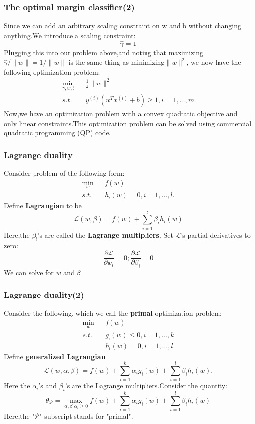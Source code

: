 \documentclass[slidestop,compress,mathserif]{beamer}
\begin{document}
    \begin{frame}[shrink]
        \frametitle{The optimal margin classifier(2)}
        Since we can add an arbitrary scaling constraint on w and b without changing anything.We introduce a scaling constraint:
        $$\hat{\gamma}=1$$
        Plugging this into our problem above,and noting that maximizing $\hat{\gamma}/\|w\|=1/\|w\|$ is the same thing as minimizing$\|w\|^2$, we now have the following optimization problem:
        \begin{eqnarray*}
            \min_{\gamma,w,b} && \frac{1}{2}\|w\|^2\\
            s.t. && y^{(i)}(w^Tx^{(i)}+b)\ge 1,i=1,\ldots,m
        \end{eqnarray*}
        Now,we have an optimization problem with a convex quadratic objective and only linear constraints.This optimization problem can be solved using commercial quadratic programming (QP) code.
        $$$$
    \end{frame}
    \begin{frame}[shrink]
        \frametitle{Lagrange duality}
        Consider problem of the following form:
        \begin{eqnarray*}
            \min_w && f(w)\\
            s.t. && h_i(w)=0,i=1,\ldots,l.
        \end{eqnarray*}
        Define \textbf{Lagrangian} to be
        $$\mathcal{L}(w,\beta)=f(w)+\sum_{i=1}^l\beta_ih_i(w)$$
        Here,the $\beta_i$'s are called the \textbf{Lagrange multipliers}. Set $\mathcal{L}$'s partial derivatives to zero:
        $$\frac{\partial\mathcal{L}}{\partial w_i}=0;\frac{\partial\mathcal{L}}{\partial \beta_i}=0$$
        We can solve for $w$ and $\beta$
        $$$$
    \end{frame}
    \begin{frame}[shrink]
        \frametitle{Lagrange duality(2)}
        Consider the following, which we call the \textbf{primal} optimization problem:
        \begin{eqnarray*}
            \min_w && f(w)\\
            s.t. && g_i(w) \le 0,i=1,\ldots,k\\
            && h_i(w)=0,i=1,\ldots,l
        \end{eqnarray*}
        Define \textbf{generalized Lagrangian}
        $$\mathcal{L}(w,\alpha,\beta)=f(w)+\sum_{i=1}^k\alpha_ig_i(w)+\sum_{i=1}^l\beta_ih_i(w).$$
        Here the $\alpha_i$'s and $\beta_i$'s are the Lagrange multipliers.Consider the quantity:
        $$\theta_\mathcal{P}=\max_{\alpha,\beta:\alpha_i\ge 0}f(w)+\sum_{i=1}^k\alpha_ig_i(w)+\sum_{i=1}^l\beta_ih_i(w)$$
        Here,the "$\mathcal{P}$" subscript stands for "primal".
        $$$$
    \end{frame}
\end{document}
